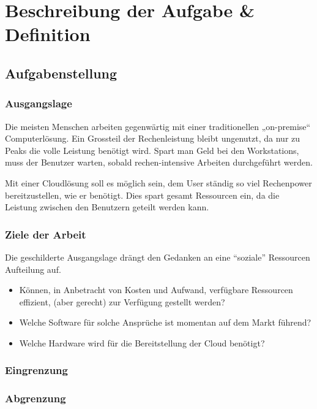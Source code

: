 \chapter{Beschreibung der Aufgabe \& Definition}

\section{Aufgabenstellung}


\subsection{Ausgangslage}
Die meisten Menschen arbeiten gegenwärtig mit einer traditionellen „on-premise“ Computerlösung.
Ein Grossteil der Rechenleistung bleibt ungenutzt, da nur zu Peaks die volle Leistung benötigt wird.
Spart man Geld bei den Workstations, muss der Benutzer warten, sobald rechen-intensive Arbeiten durchgeführt werden. 

Mit einer Cloudlösung soll es möglich sein, dem User ständig so viel Rechenpower bereitzustellen, wie er benötigt.
Dies spart gesamt Ressourcen ein, da die Leistung zwischen den Benutzern geteilt werden kann.

\subsection{Ziele der Arbeit}
Die geschilderte Ausgangslage drängt den Gedanken an eine “soziale” Ressourcen Aufteilung auf.

\begin{itemize}
	\item Können, in Anbetracht von Kosten und Aufwand, verfügbare Ressourcen effizient, (aber gerecht) zur Verfügung gestellt werden?
	\item Welche Software für solche Ansprüche ist momentan auf dem Markt führend?
	\item Welche Hardware wird für die Bereitstellung der Cloud benötigt?
\end{itemize}


\subsection{Eingrenzung}


\subsection{Abgrenzung}



